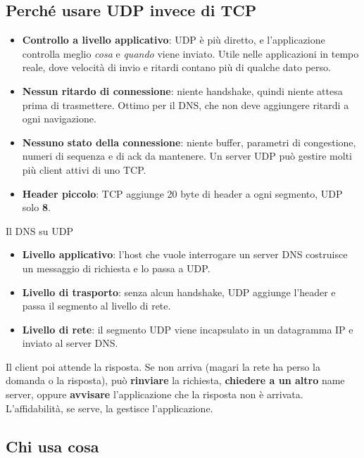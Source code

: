 \subsection{Perché usare UDP invece di TCP}

\begin{itemize}
    \item \textbf{Controllo a livello applicativo}: UDP è più diretto, e l'applicazione controlla meglio
          \emph{cosa} e \emph{quando} viene inviato. Utile nelle applicazioni in tempo reale, dove velocità di
          invio e ritardi contano più di qualche dato perso.
    \item \textbf{Nessun ritardo di connessione}: niente handshake, quindi niente attesa prima di trasmettere.
          Ottimo per il DNS, che non deve aggiungere ritardi a ogni navigazione.
    \item \textbf{Nessuno stato della connessione}: niente buffer, parametri di congestione, numeri di sequenza e di
          ack da mantenere. Un server UDP può gestire molti più client attivi di uno TCP.
    \item \textbf{Header piccolo}: TCP aggiunge 20 byte di header a ogni segmento, UDP solo \textbf{8}.
\end{itemize}

\begin{esempio}{Il DNS su UDP}
\begin{itemize}
    \item \textbf{Livello applicativo}: l'host che vuole interrogare un server DNS costruisce un messaggio di
          richiesta e lo passa a UDP.
    \item \textbf{Livello di trasporto}: senza alcun handshake, UDP aggiunge l'header e passa il segmento al
          livello di rete.
    \item \textbf{Livello di rete}: il segmento UDP viene incapsulato in un datagramma IP e inviato al server DNS.
\end{itemize}
Il client poi attende la risposta. Se non arriva (magari la rete ha perso la domanda o la risposta), può
\textbf{rinviare} la richiesta, \textbf{chiedere a un altro} name server, oppure \textbf{avvisare} l'applicazione
che la risposta non è arrivata. L'affidabilità, se serve, la gestisce l'applicazione.
\end{esempio}

\subsection{Chi usa cosa}

